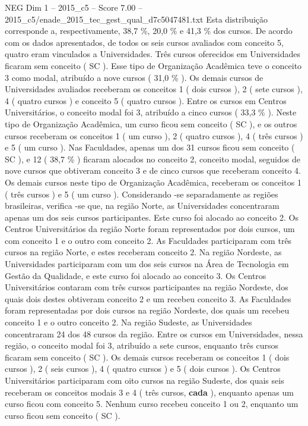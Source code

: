 \begin{textsample}{NEG Dim 1 – 2015\_c5 – Score 7.00 – 2015\_c5/enade\_2015\_tec\_gest\_qual\_d7c5047481.txt}
Esta distribuição corresponde a, respectivamente, 38,7 \%, 20,0 \% e 41,3 \% dos cursos.
De acordo com os dados apresentados, de todos os seis cursos avaliados com conceito 5, quatro eram vinculados a Universidades.
Três cursos oferecidos em Universidades ficaram sem conceito ( SC ).
Esse tipo de Organização Acadêmica teve o conceito 3 como modal, atribuído a nove cursos ( 31,0 \% ).
Os demais cursos de Universidades avaliados receberam os conceitos 1 ( dois cursos ), 2 ( sete cursos ), 4 ( quatro cursos ) e conceito 5 ( quatro cursos ).
Entre os cursos em Centros Universitários, o conceito modal foi 3, atribuído a cinco cursos ( 33,3 \% ).
Neste tipo de Organização Acadêmica, um curso ficou sem conceito ( SC ), e os outros cursos receberam os conceitos 1 ( um curso ), 2 ( quatro cursos ), 4 ( três cursos ) e 5 ( um curso ).
Nas Faculdades, apenas um dos 31 cursos ficou sem conceito ( SC ), e 12 ( 38,7 \% ) ficaram alocados no conceito 2, conceito modal, seguidos de nove cursos que obtiveram conceito 3 e de cinco cursos que receberam conceito 4.
Os demais cursos neste tipo de Organização Acadêmica, receberam os conceitos 1 ( três cursos ) e 5 ( um curso ).
Considerando -se separadamente as regiões brasileiras, verifica -se que, na região Norte, as Universidades concentraram apenas um dos seis cursos participantes.
Este curso foi alocado ao conceito 2.
Os Centros Universitários da região Norte foram representados por dois cursos, um com conceito 1 e o outro com conceito 2.
As Faculdades participaram com três cursos na região Norte, e estes receberam conceito 2.
Na região Nordeste, as Universidades participaram com um dos seis cursos na Área de Tecnologia em Gestão da Qualidade, e este curso foi alocado ao conceito 3.
Os Centros Universitários contaram com três cursos participantes na região Nordeste, dos quais dois destes obtiveram conceito 2 e um recebeu conceito 3.
As Faculdades foram representadas por dois cursos na região Nordeste, dos quais um recebeu conceito 1 e o outro conceito 2.
Na região Sudeste, as Universidades concentraram 24 dos 48 cursos da região.
Entre os cursos em Universidades, nessa região, o conceito modal foi 3, atribuído a sete cursos, enquanto três cursos ficaram sem conceito ( SC ).
Os demais cursos receberam os conceitos 1 ( dois cursos ), 2 ( seis cursos ), 4 ( quatro cursos ) e 5 ( dois cursos ).
Os Centros Universitários participaram com oito cursos na região Sudeste, dos quais seis receberam os conceitos modais 3 e 4 ( três cursos, \textbf{cada} ), enquanto apenas um curso ficou com conceito 5.
Nenhum curso recebeu conceito 1 ou 2, enquanto um curso ficou sem conceito ( SC ).

\end{textsample}
